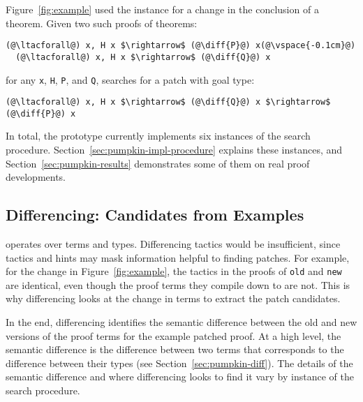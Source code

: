 Figure~\ref{fig:example} used the instance for a change in the conclusion of a theorem.
Given two such proofs of theorems:

\begin{lstlisting}[language=coq]
  (@\ltacforall@) x, H x $\rightarrow$ (@\diff{P}@) x(@\vspace{-0.1cm}@)
  (@\ltacforall@) x, H x $\rightarrow$ (@\diff{Q}@) x
\end{lstlisting}
for any \lstinline{x}, \lstinline{H}, \lstinline{P}, and \lstinline{Q},
\sysname searches for a patch with goal type:

\begin{lstlisting}[language=coq]
  (@\ltacforall@) x, H x $\rightarrow$ (@\diff{Q}@) x $\rightarrow$ (@\diff{P}@) x
\end{lstlisting}

In total, the \sysname prototype currently implements six instances of the search procedure.
Section~\ref{sec:pumpkin-impl-procedure} explains these instances,
and Section~\ref{sec:pumpkin-results} demonstrates some of them on real proof developments.

\subsection{Differencing: Candidates from Examples}
\label{sec:pumpkin-spec-diff}

 operates over terms and types. Differencing tactics
would be insufficient, since tactics and hints may mask information helpful to finding patches.
For example, for the change in Figure~\ref{fig:example},
the tactics in the proofs of \lstinline{old} and \lstinline{new} are identical, even 
though the proof terms they compile down to are not. %
This is why differencing looks at the change in terms to extract the patch candidates.

In the end, differencing identifies the semantic difference between the old and new versions of the proof terms for the example patched proof.
At a high level, the semantic difference is the difference between two terms that corresponds to the 
difference between their types (see Section~\ref{sec:pumpkin-diff}).
The details of the semantic difference and where differencing looks to find it vary by instance of the search procedure.

